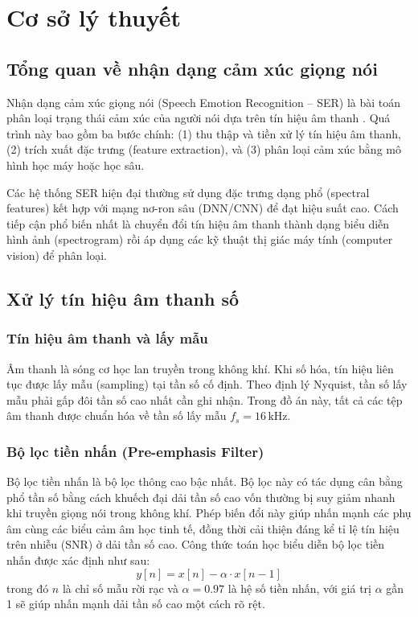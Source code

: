 \chapter{Cơ sở lý thuyết}
\label{chap:theory}

\section{Tổng quan về nhận dạng cảm xúc giọng nói}
\label{sec:ser_overview}

Nhận dạng cảm xúc giọng nói (Speech Emotion Recognition -- SER) là bài toán phân loại trạng thái cảm xúc của người nói dựa trên tín hiệu âm thanh \cite{el2011, schuller2018}. Quá trình này bao gồm ba bước chính: (1) thu thập và tiền xử lý tín hiệu âm thanh, (2) trích xuất đặc trưng (feature extraction), và (3) phân loại cảm xúc bằng mô hình học máy hoặc học sâu.

Các hệ thống SER hiện đại thường sử dụng đặc trưng dạng phổ (spectral features) kết hợp với mạng nơ-ron sâu (DNN/CNN) để đạt hiệu suất cao. Cách tiếp cận phổ biến nhất là chuyển đổi tín hiệu âm thanh thành dạng biểu diễn hình ảnh (spectrogram) rồi áp dụng các kỹ thuật thị giác máy tính (computer vision) để phân loại.

\section{Xử lý tín hiệu âm thanh số}
\label{sec:signal_processing}

\subsection{Tín hiệu âm thanh và lấy mẫu}

Âm thanh là sóng cơ học lan truyền trong không khí. Khi số hóa, tín hiệu liên tục được lấy mẫu (sampling) tại tần số cố định. Theo định lý Nyquist, tần số lấy mẫu phải gấp đôi tần số cao nhất cần ghi nhận. Trong đồ án này, tất cả các tệp âm thanh được chuẩn hóa về tần số lấy mẫu $f_s = 16\,\text{kHz}$.

\subsection{Bộ lọc tiền nhấn (Pre-emphasis Filter)}

Bộ lọc tiền nhấn là bộ lọc thông cao bậc nhất. Bộ lọc này có tác dụng cân bằng phổ tần số bằng cách khuếch đại dải tần số cao vốn thường bị suy giảm nhanh khi truyền giọng nói trong không khí. Phép biến đổi này giúp nhấn mạnh các phụ âm cùng các biểu cảm âm học tinh tế, đồng thời cải thiện đáng kể tỉ lệ tín hiệu trên nhiễu (SNR) ở dải tần số cao. Công thức toán học biểu diễn bộ lọc tiền nhấn được xác định như sau:
\begin{equation}
    y[n] = x[n] - \alpha \cdot x[n-1]
    \label{eq:preemphasis}
\end{equation}
trong đó $n$ là chỉ số mẫu rời rạc và $\alpha = 0.97$ là hệ số tiền nhấn, với giá trị $\alpha$ gần 1 sẽ giúp nhấn mạnh dải tần số cao một cách rõ rệt.

